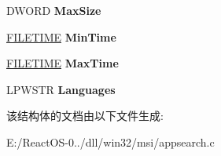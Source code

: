 \begin{DoxyCompactItemize}
D\+W\+O\+RD {\bfseries Max\+Size}
\item 
\mbox{\label{structtag_m_s_i_s_i_g_n_a_t_u_r_e_a4d62b7e3e5ea8bce953ffa35ce44f8ed}} 
\hyperlink{struct___f_i_l_e_t_i_m_e}{F\+I\+L\+E\+T\+I\+ME} {\bfseries Min\+Time}
\item 
\mbox{\label{structtag_m_s_i_s_i_g_n_a_t_u_r_e_a67842780c3b81142af9676b85c213c82}} 
\hyperlink{struct___f_i_l_e_t_i_m_e}{F\+I\+L\+E\+T\+I\+ME} {\bfseries Max\+Time}
\item 
\mbox{\label{structtag_m_s_i_s_i_g_n_a_t_u_r_e_af8845c226d38955d5cc0e5cda635dfde}} 
L\+P\+W\+S\+TR {\bfseries Languages}
\end{DoxyCompactItemize}


该结构体的文档由以下文件生成\+:\begin{DoxyCompactItemize}
\item 
E\+:/\+React\+O\+S-\/0../dll/win32/msi/appsearch.\+c\end{DoxyCompactItemize}
